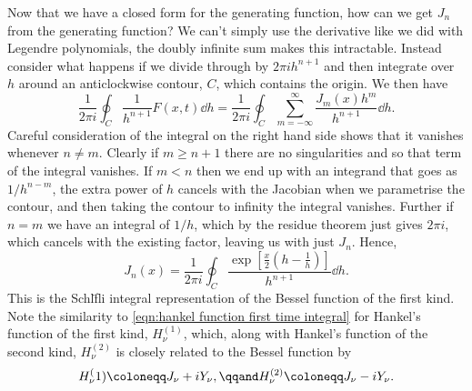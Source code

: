 \documentclass[fleqn]{NotesClass}
\begin{document}
    Now that we have a closed form for the generating function, how can we get \(J_n\) from the generating function?
    We can't simply use the derivative like we did with Legendre polynomials, the doubly infinite sum makes this intractable.
    Instead consider what happens if we divide through by \(2\pi i h^{n+1}\) and then integrate over \(h\) around an anticlockwise contour, \(C\), which contains the origin.
    We then have
    \begin{equation}
        \frac{1}{2\pi i} \oint_C \frac{1}{h^{n+1}} F(x, t) \dd{h} = \frac{1}{2\pi i} \oint_C \sum_{m=-\infty}^{\infty} \frac{J_m(x)h^m}{h^{n+1}} \dd{h}.
    \end{equation}
    Careful consideration of the integral on the right hand side shows that it vanishes whenever \(n \ne m\).
    Clearly if \(m \ge n + 1\) there are no singularities and so that term of the integral vanishes.
    If \(m < n\) then we end up with an integrand that goes as \(1/h^{n - m}\), the extra power of \(h\) cancels with the Jacobian when we parametrise the contour, and then taking the contour to infinity the integral vanishes.
    Further if \(n = m\) we have an integral of \(1/h\), which by the residue theorem just gives \(2\pi i\), which cancels with the existing factor, leaving us with just \(J_n\).
    Hence,
    \begin{equation}
        J_{n}(x) = \frac{1}{2\pi i} \oint_C \frac{\exp\left[ \frac{x}{2}\left( h - \frac{1}{h} \right) \right]}{h^{n + 1}} \dd{h}.
    \end{equation}
    This is the Schl\"fli integral representation of the Bessel function of the first kind.
    Note the similarity to \cref{eqn:hankel function first time integral} for Hankel's function of the first kind, \(H_\nu^{(1)}\), which, along with Hankel's function of the second kind, \(H_\nu^{(2)}\) is closely related to the Bessel function by
    \begin{equation}
        H_\nu^(1) \coloneqq J_\nu + iY_\nu, \qqand H_\nu^{(2)} \coloneqq J_\nu - iY_\nu.
    \end{equation}
\end{document}
